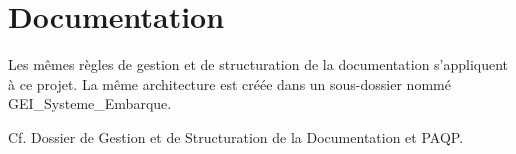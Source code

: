 \section{Documentation}

Les mêmes règles de gestion et de structuration de la documentation 
s'appliquent à ce projet. La même architecture est créée dans un sous-dossier 
nommé GEI\_Systeme\_Embarque.

Cf. Dossier de Gestion et de Structuration de la Documentation et PAQP. 
